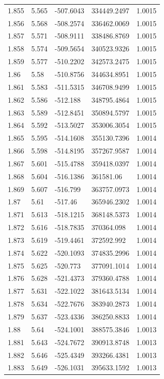 \begin{tabular}{lllll}
1.855 & 5.565 & -507.6043 & 334449.2497 & 1.0015 \\
1.856 & 5.568 & -508.2574 & 336462.0069 & 1.0015 \\
1.857 & 5.571 & -508.9111 & 338486.8769 & 1.0015 \\
1.858 & 5.574 & -509.5654 & 340523.9326 & 1.0015 \\
1.859 & 5.577 & -510.2202 & 342573.2475 & 1.0015 \\
1.86 & 5.58 & -510.8756 & 344634.8951 & 1.0015 \\
1.861 & 5.583 & -511.5315 & 346708.9499 & 1.0015 \\
1.862 & 5.586 & -512.188 & 348795.4864 & 1.0015 \\
1.863 & 5.589 & -512.8451 & 350894.5797 & 1.0015 \\
1.864 & 5.592 & -513.5027 & 353006.3054 & 1.0015 \\
1.865 & 5.595 & -514.1608 & 355130.7396 & 1.0014 \\
1.866 & 5.598 & -514.8195 & 357267.9587 & 1.0014 \\
1.867 & 5.601 & -515.4788 & 359418.0397 & 1.0014 \\
1.868 & 5.604 & -516.1386 & 361581.06 & 1.0014 \\
1.869 & 5.607 & -516.799 & 363757.0973 & 1.0014 \\
1.87 & 5.61 & -517.46 & 365946.2302 & 1.0014 \\
1.871 & 5.613 & -518.1215 & 368148.5373 & 1.0014 \\
1.872 & 5.616 & -518.7835 & 370364.098 & 1.0014 \\
1.873 & 5.619 & -519.4461 & 372592.992 & 1.0014 \\
1.874 & 5.622 & -520.1093 & 374835.2996 & 1.0014 \\
1.875 & 5.625 & -520.773 & 377091.1014 & 1.0014 \\
1.876 & 5.628 & -521.4373 & 379360.4788 & 1.0014 \\
1.877 & 5.631 & -522.1022 & 381643.5134 & 1.0014 \\
1.878 & 5.634 & -522.7676 & 383940.2873 & 1.0014 \\
1.879 & 5.637 & -523.4336 & 386250.8833 & 1.0014 \\
1.88 & 5.64 & -524.1001 & 388575.3846 & 1.0013 \\
1.881 & 5.643 & -524.7672 & 390913.8748 & 1.0013 \\
1.882 & 5.646 & -525.4349 & 393266.4381 & 1.0013 \\
1.883 & 5.649 & -526.1031 & 395633.1592 & 1.0013 \\

\end{tabular}
